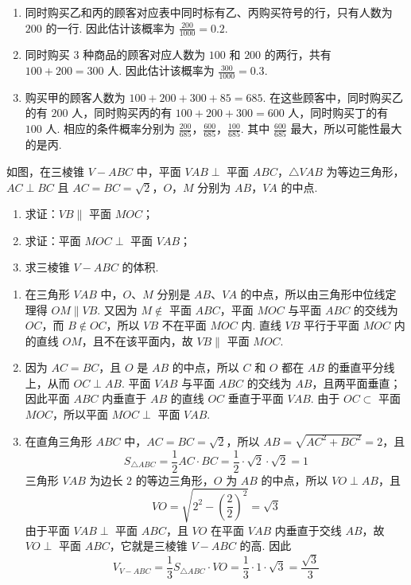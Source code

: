 \begin{solution}
\begin{enumerate}
\item 同时购买乙和丙的顾客对应表中同时标有乙、丙购买符号的行，只有人数为 \(200\) 的一行. 因此估计该概率为 \(\frac{200}{1000}=0.2\).
\item 同时购买 \(3\) 种商品的顾客对应人数为 \(100\) 和 \(200\) 的两行，共有 \(100+200=300\) 人. 因此估计该概率为 \(\frac{300}{1000}=0.3\).
\item 购买甲的顾客人数为 \(100+200+300+85=685\). 在这些顾客中，同时购买乙的有 \(200\) 人，同时购买丙的有 \(100+200+300=600\) 人，同时购买丁的有 \(100\) 人. 相应的条件概率分别为
\(\frac{200}{685}\)，\(\frac{600}{685}\)，\(\frac{100}{685}\).
其中 \(\frac{600}{685}\) 最大，所以可能性最大的是丙.
\end{enumerate}
\end{solution}

\begin{problem}
如图，在三棱锥 \(V-ABC\) 中，平面 \(VAB \perp\) 平面 \(ABC\)，\(\triangle VAB\) 为等边三角形，\(AC \perp BC\) 且 \(AC = BC = \sqrt{2}\)，\(O\)，\(M\) 分别为 \(AB\)，\(VA\) 的中点.

\begin{enumerate}
\item 求证：\(VB\parallel\) 平面 \(MOC\)；
\item 求证：平面 \(MOC\perp\) 平面 \(VAB\)；
\item 求三棱锥 \(V-ABC\) 的体积.
\end{enumerate}

\end{problem}

\begin{solution}
\begin{enumerate}
\item 在三角形 \(VAB\) 中，\(O\)、\(M\) 分别是 \(AB\)、\(VA\) 的中点，所以由三角形中位线定理得 \(OM\parallel VB\). 又因为 \(M\notin\) 平面 \(ABC\)，平面 \(MOC\) 与平面 \(ABC\) 的交线为 \(OC\)，而 \(B\notin OC\)，所以 \(VB\) 不在平面 \(MOC\) 内. 直线 \(VB\) 平行于平面 \(MOC\) 内的直线 \(OM\)，且不在该平面内，故 \(VB\parallel\) 平面 \(MOC\).
\item 因为 \(AC=BC\)，且 \(O\) 是 \(AB\) 的中点，所以 \(C\) 和 \(O\) 都在 \(AB\) 的垂直平分线上，从而 \(OC\perp AB\). 平面 \(VAB\) 与平面 \(ABC\) 的交线为 \(AB\)，且两平面垂直；因此平面 \(ABC\) 内垂直于 \(AB\) 的直线 \(OC\) 垂直于平面 \(VAB\). 由于 \(OC\subset\) 平面 \(MOC\)，所以平面 \(MOC\perp\) 平面 \(VAB\).
\item 在直角三角形 \(ABC\) 中，\(AC=BC=\sqrt2\)，所以 \(AB=\sqrt{AC^2+BC^2}=2\)，且
\[
S_{\triangle ABC}=\frac12 AC\cdot BC=\frac12\cdot\sqrt2\cdot\sqrt2=1
\]
三角形 \(VAB\) 为边长 \(2\) 的等边三角形，\(O\) 为 \(AB\) 的中点，所以 \(VO\perp AB\)，且
\[
VO=\sqrt{2^2-\left(\frac{2}{2}\right)^2}=\sqrt3
\]
由于平面 \(VAB\perp\) 平面 \(ABC\)，且 \(VO\) 在平面 \(VAB\) 内垂直于交线 \(AB\)，故 \(VO\perp\) 平面 \(ABC\)，它就是三棱锥 \(V-ABC\) 的高. 因此
\[
V_{V-ABC}=\frac13S_{\triangle ABC}\cdot VO=\frac13\cdot1\cdot\sqrt3=\frac{\sqrt3}{3}
\]
\end{enumerate}
\end{solution}

